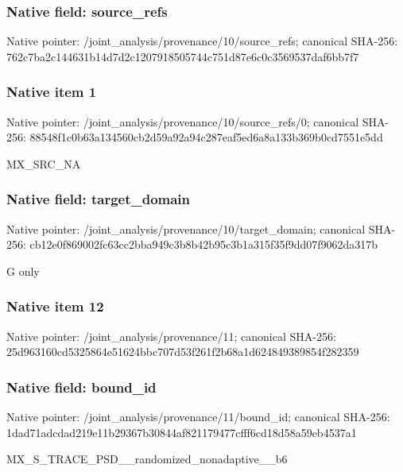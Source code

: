 \documentclass[10pt,a4paper]{article}
\begin{document}
\subsubsection{Native field: source\_\allowbreak{}refs}
Native pointer: /joint\_\allowbreak{}analysis/provenance/10/source\_\allowbreak{}refs; canonical SHA-256: 762c7ba2c144631b14d7d2c1207918505744c751d87e6c0c3569537daf6bb7f7

\subsubsection{Native item 1}
Native pointer: /joint\_\allowbreak{}analysis/provenance/10/source\_\allowbreak{}refs/0; canonical SHA-256: 88548f1c0b63a134560cb2d59a92a94c287eaf5ed6a8a133b369b0cd7551e5dd

\begingroup\raggedright\sloppy MX\_\allowbreak{}SRC\_\allowbreak{}NA\par\endgroup

\subsubsection{Native field: target\_\allowbreak{}domain}
Native pointer: /joint\_\allowbreak{}analysis/provenance/10/target\_\allowbreak{}domain; canonical SHA-256: cb12e0f869002fc63cc2bba949c3b8b42b95c3b1a315f35f9dd07f9062da317b

\begingroup\raggedright\sloppy G only\par\endgroup

\subsubsection{Native item 12}
Native pointer: /joint\_\allowbreak{}analysis/provenance/11; canonical SHA-256: 25d963160cd5325864e51624bbc707d53f261f2b68a1d624849389854f282359

\subsubsection{Native field: bound\_\allowbreak{}id}
Native pointer: /joint\_\allowbreak{}analysis/provenance/11/bound\_\allowbreak{}id; canonical SHA-256: 1dad71adcdad219e11b29367b30844af821179477cfff6cd18d58a59eb4537a1

\begingroup\raggedright\sloppy MX\_\allowbreak{}S\_\allowbreak{}TRACE\_\allowbreak{}PSD\_\allowbreak{}\_\allowbreak{}randomized\_\allowbreak{}nonadaptive\_\allowbreak{}\_\allowbreak{}b6\par\endgroup
\end{document}
